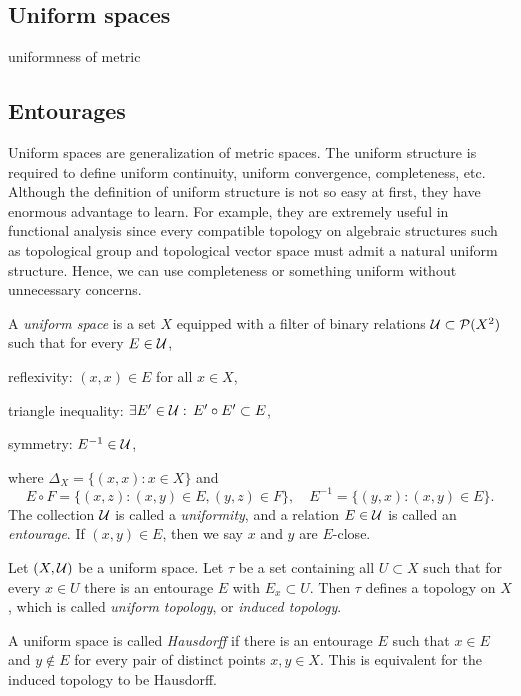 \documentclass{../crs}
\begin{document}
\subsection{Uniform spaces}
uniformness of metric


\subsection{Entourages}


Uniform spaces are generalization of metric spaces.
The uniform structure is required to define uniform continuity, uniform convergence, completeness, etc.
Although the definition of uniform structure is not so easy at first, they have enormous advantage to learn.
For example, they are extremely useful in functional analysis since every compatible topology on algebraic structures such as topological group and topological vector space must admit a natural uniform structure.
Hence, we can use completeness or something uniform without unnecessary concerns.

\begin{defn}
A \emph{uniform space} is a set $X$ equipped with a filter of binary relations $\mathcal{U}\subset\mathcal{P}(X^2)$ such that for every $E\in\mathcal{U}$,
\begin{cond}
\item reflexivity: $(x,x)\in E$ for all $x\in X$,
\item triangle inequality: $\exists E'\in\mathcal{U}:\,E'\circ E'\subset E$,
\item symmetry: $E^{-1}\in\mathcal{U}$,
\end{cond}
where $\Delta_X=\{(x,x):x\in X\}$ and
\[E\circ F=\{(x,z):(x,y)\in E,(y,z)\in F\},\quad E^{-1}=\{(y,x):(x,y)\in E\}.\]
The collection $\mathcal{U}$ is called a \emph{uniformity}, and a relation $E\in\mathcal{U}$ is called an \emph{entourage}.
If $(x,y)\in E$, then we say $x$ and $y$ are $E$-close.
\end{defn}
\begin{defn}
Let $(X,\mathcal{U})$ be a uniform space.
Let $\tau$ be a set containing all $U\subset X$ such that for every $x\in U$ there is an entourage $E$ with $E_x\subset U$.
Then $\tau$ defines a topology on $X$, which is called \emph{uniform topology}, or \emph{induced topology}.
\end{defn}
\begin{defn}
A uniform space is called \emph{Hausdorff} if there is an entourage $E$ such that $x\in E$ and $y\notin E$ for every pair of distinct points $x,y\in X$.
This is equivalent for the induced topology to be Hausdorff.
\end{defn}
\end{document}
